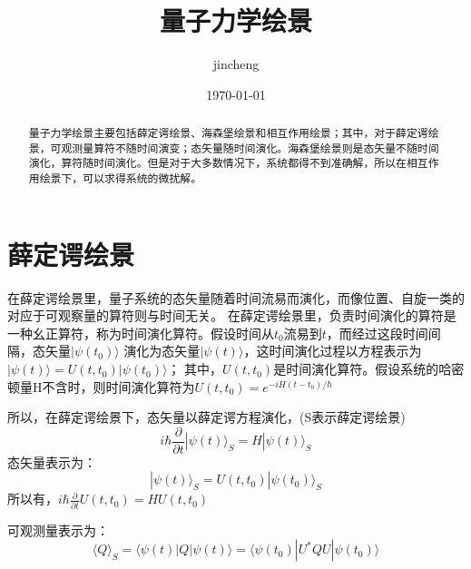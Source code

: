 \documentclass[%
 reprint,
 amsmath,amssymb,
 aps,
]{revtex4-1}
\begin{document}

\title{量子力学绘景}%

\author{jincheng}
%



\date{\today}%

\begin{abstract}
量子力学绘景主要包括薛定谔绘景、海森堡绘景和相互作用绘景；其中，对于薛定谔绘景，可观测量算符不随时间演变；态矢量随时间演化。海森堡绘景则是态矢量不随时间演化，算符随时间演化。但是对于大多数情况下，系统都得不到准确解，所以在相互作用绘景下，可以求得系统的微扰解。
\end{abstract}

\maketitle


\section{\label{sec:level1}薛定谔绘景}
	
在薛定谔绘景里，量子系统的态矢量随着时间流易而演化，而像位置、自旋一类的对应于可观察量的算符则与时间无关。
在薛定谔绘景里，负责时间演化的算符是一种幺正算符，称为时间演化算符。假设时间从${\displaystyle t_{0}}$流易到${\displaystyle t}$，而经过这段时间间隔，态矢量${\displaystyle |\psi (t_0)\rangle }$ 演化为态矢量${\displaystyle |\psi (t)\rangle }$，这时间演化过程以方程表示为$|\psi (t)\rangle =U(t,t_{0})|\psi (t_{0})\rangle$；
其中，$U(t,t_{0})$是时间演化算符。假设系统的哈密顿量H不含时，则时间演化算符为$U(t,t_{0})=e^{-iH(t-t_{0})/\hbar}$


所以，在薛定谔绘景下，态矢量以薛定谔方程演化，(S表示薛定谔绘景)$$i\hbar \frac{\partial}{\partial t} |\psi(t)\rangle_S = H |\psi(t)\rangle_S$$
态矢量表示为：$$|\psi(t)\rangle_S=U(t,t_0)|\psi(t_0)\rangle_S$$所以有，$i\hbar \frac{\partial}{\partial t} U(t,t_0) = H U(t,t_0)$

可观测量表示为：$$\langle Q \rangle_S = \langle \psi(t) | Q | \psi(t) \rangle = \langle\psi(t_0) |U^*Q U| \psi(t_0)\rangle $$
\end{document}
